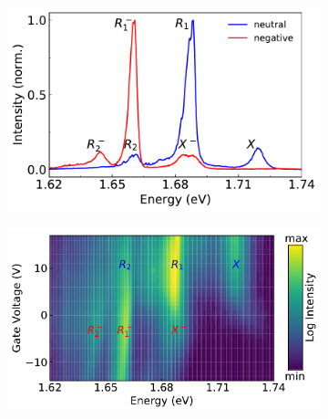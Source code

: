 \begin{figure}
	\begin{subfigure}{0.49\textwidth}
		\caption{}
		\includegraphics[height=0.65\textwidth]{spectrum_neutral_negative}
	\end{subfigure}
	\begin{subfigure}{0.49\textwidth}
		\caption{}
		\includegraphics[height=0.65\textwidth]{Voltsweep}
	\end{subfigure}
\end{figure}

